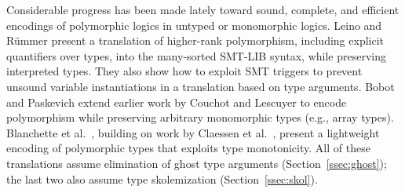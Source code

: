 Considerable progress has been made lately toward sound, complete, and efficient
encodings of polymorphic logics in untyped or monomorphic logics. Leino and
R\"ummer \cite{leino-ruemmer-2010} present a translation of higher-rank
polymorphism, including explicit quantifiers over types, into the many-sorted
SMT-LIB syntax, while preserving interpreted types. They also show how to
exploit SMT triggers to prevent unsound variable instantiations in a
translation based on type arguments. Bobot and Paskevich
\cite{bobot-paskevich-2011} extend earlier work by Couchot and Lescuyer
\cite{couchot-lescuyer-2007} to encode polymorphism while preserving
arbitrary monomorphic types (e.g., array types).
Blanchette et
al.\ \cite{blanchette-et-al-2012-mono}, building on work by Claessen et al.\
\cite{claessen-et-al-2011}, present a %
lightweight encoding of
polymorphic types that exploits type monotonicity. All of these translations
assume %
elimination of ghost type arguments
(Section~\ref{ssec:ghost}); the last two also assume type skolemization
(Section~\ref{ssec:skol}).


